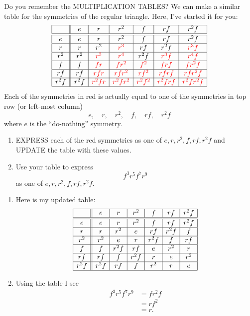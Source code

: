 \documentclass[noauthor,nooutcomes,hints,handout]{ximera}
\begin{document}
\begin{question}
  Do you remember the MULTIPLICATION TABLES? We can make a similar
  table for the symmetries of the regular triangle. Here, I've
  started it for you:
  \[
  \begin{array}{|c||c|c|c|c|c|c|}
    \hline
      & e & r & r^2 & f & rf & r^2f\\ \hline\hline
    e & e & r & r^2 & f & rf & r^2f\\ \hline
    r & r & r^2 & \color{red}r^3 & rf & r^2f & \color{red}r^3f\\ \hline
    r^2 & r^2 & \color{red}r^3 & \color{red}r^4 & r^2f & \color{red}r^3f &\color{red} r^4f\\ \hline
    f  & f & \color{red}fr & \color{red}fr^2 & \color{red}f^2 & \color{red}frf & \color{red}fr^2f\\ \hline
    rf & rf & \color{red}rfr & \color{red}rfr^2 & \color{red}rf^2 & \color{red}rfrf & \color{red}rfr^2f\\ \hline
    r^2f & r^2f & \color{red}r^2fr & \color{red}r^2fr^2 & \color{red}r^2f^2 &\color{red} r^2frf &\color{red} r^2fr^2f\\ \hline
  \end{array}
  \]
  Each of the symmetries in red is actually equal to one of the
  symmetries in top row (or left-most column)
  \[
  e,\quad r,\quad r^2,\quad f,\quad rf,\quad r^2f
  \]
  where $e$ is the ``do-nothing'' symmetry.
  \begin{enumerate}
    \item EXPRESS each of the red symmetries as one of
      $e,r,r^2,f,rf,r^2f$ and UPDATE the table with these values.
    \item Use your table to express
      \[
      f^3r^5f^7r^9
      \]
      as one of $e,r,r^2,f,rf,r^2f$.
  \end{enumerate}
  \begin{freeResponse}
      \begin{enumerate}
      \item
      Here is my updated table:
       \[
  \begin{array}{|c||c|c|c|c|c|c|}
    \hline
    & e & r & r^2 & f & rf & r^2f\\ \hline\hline
    e & e & r & r^2 & f & rf & r^2f\\ \hline
    r & r & r^2 & e & rf & r^2f & f\\ \hline
    r^2 & r^2 & e & r & r^2f & f &rf\\ \hline
    f  & f & r^2f & rf & e & r^2 & r\\ \hline
    rf & rf & f & r^2f & r & e & r^2\\ \hline
    r^2f & r^2f & rf & f & r^2 & r & e\\ \hline
  \end{array}
  \]
\item Using the table I see
  \begin{align*}
    f^3r^5f^7r^9 &= fr^2f\\
    &= rf^2\\
    &= r.
  \end{align*}
    \end{enumerate}
  \end{freeResponse}
\end{question}
\end{document}
